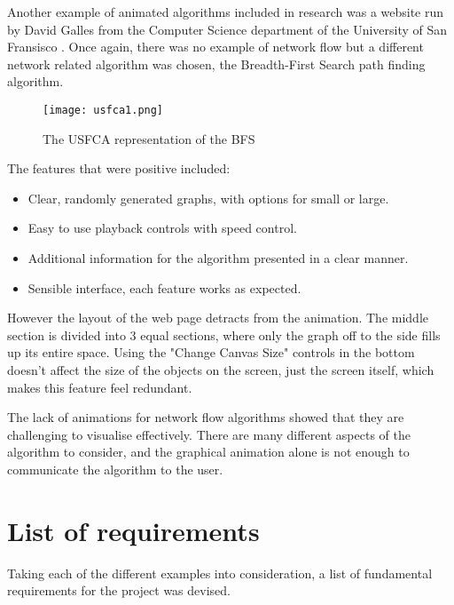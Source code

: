 \documentclass{l4proj}
\begin{document}
Another example of animated algorithms included in research was a website run by David Galles from the Computer Science department of the University of San Fransisco \cite{usfca}. Once again, there was no example of network flow but a different network related algorithm was chosen, the Breadth-First Search path finding algorithm.

\begin{figure}
    \centering
    \texttt{[image: usfca1.png]}
    \caption{The USFCA representation of the BFS}
    \label{fig:my_label}
\end{figure}

The features that were positive included:

\begin{itemize}[noitemsep]
    \item Clear, randomly generated graphs, with options for small or large.
    \item Easy to use playback controls with speed control.
    \item Additional information for the algorithm presented in a clear manner.
    \item Sensible interface, each feature works as expected.
\end{itemize}

However the layout of the web page detracts from the animation. The middle section is divided into 3 equal sections, where only the graph off to the side fills up its entire space. Using the "Change Canvas Size" controls in the bottom doesn't affect the size of the objects on the screen, just the screen itself, which makes this feature feel redundant.

The lack of animations for network flow algorithms showed that they are challenging to visualise effectively. There are many different aspects of the algorithm to consider, and the graphical animation alone is not enough to communicate the algorithm to the user.

\section{List of requirements}
Taking each of the different examples into consideration, a list of fundamental requirements for the project was devised.
\end{document}

